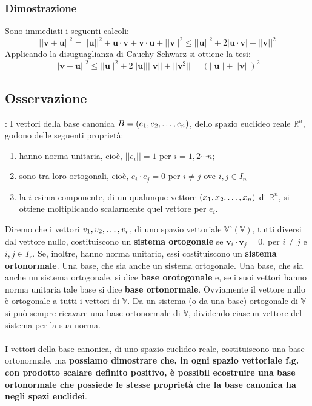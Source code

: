 \documentclass[../main.tex]{subfiles}
\begin{document}
\subsubsection{Dimostrazione}
Sono immediati i seguenti calcoli:
\[
    ||\textbf{v}+\textbf{u}||^2=||\textbf{u}||^2+\textbf{u}\cdot\textbf{v}+\textbf{v}\cdot\textbf{u}+||\textbf{v}||^2\leq||\textbf{u}||^2+2|\textbf{u}\cdot\textbf{v}|+||\textbf{v}||^2
\]
Applicando la disuguaglianza di Cauchy-Schwarz si ottiene la tesi:
\[
    ||\textbf{v}+\textbf{u}||^2\leq||\textbf{u}||^2+2||\textbf{u}|| ||\textbf{v}||+||\textbf{v}^2||=(||\textbf{u}||+||\textbf{v}||)^2
\]

\subsection{Osservazione}:
I vettori della base canonica $B = (e_1, e_2, \ldots, e_{n})$, dello spazio euclideo reale $\mathbb{R}^n$, godono delle seguenti proprietà:
\begin{enumerate}
    \item hanno norma unitaria, cioè, $||e_i||=1 \text{ per } i=1,2\cdots n$;
    \item sono tra loro ortogonali, cioè, $e_i\cdot e_j = 0$ per $i\ne j$ ove $i, j\in I_n$
    \item la $i$-esima componente, di un qualunque vettore $(x_1, x_2, \ldots, x_{n})$ di $\mathbb{R}^n$, si ottiene moltiplicando scalarmente quel vettore per $e_i$.
\end{enumerate}

Diremo che i vettori $v_1, v_2, \ldots, v_{r}$, di uno spazio vettoriale $\mathbb{V}^{\circ}(\mathbb{V})$, tutti diversi dal vettore nullo, 
costituiscono un \textbf{sistema ortogonale} se $\textbf{v}_i\cdot\textbf{v}_j = 0$, per $i\ne j $ e $i,j\in I_r$. 
Se, inoltre, hanno norma unitario, essi costituiscono un \textbf{sistema ortonormale}. 
Una base, che sia anche un sistema ortogonale. Una base, che sia anche un sistema ortogonale, 
si dice \textbf{base orotogonale} e, se i suoi vettori hanno norma unitaria tale base si dice \textbf{base ortonormale}. 
Ovviamente il vettore nullo è ortogonale a tutti i vettori di $\mathbb{V}$. Da un sistema (o da una base) ortogonale di
$\mathbb{V}$ si può sempre ricavare una base ortonormale di $\mathbb{V}$, dividendo ciascun vettore del sistema per la sua norma.\\ \\
I vettori della base canonica, di uno spazio euclideo reale, costituiscono una base ortonormale, ma \textbf{possiamo dimostrare che, in ogni spazio vettoriale f.g. con prodotto scalare definito positivo, è possibil ecostruire una base ortonormale che possiede le stesse proprietà che la base canonica ha negli spazi euclidei}.
\end{document}
